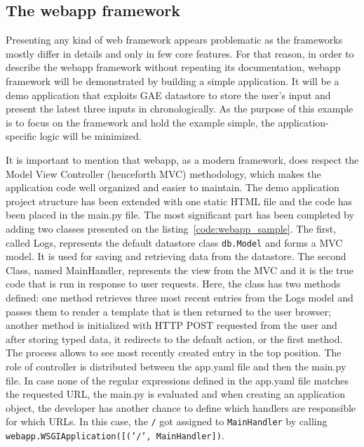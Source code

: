 \subsection{The webapp framework}\label{subsec:webapp}
Presenting any kind of web framework appears problematic as the frameworks mostly differ in details and only in few core features. For that reason, in order to describe the webapp framework without repeating its documentation, webapp framework will be demonstrated by building a simple application. It will be a demo application that exploits GAE datastore to store the user's input and present the latest three inputs in chronologically. As the purpose of this example is to focus on the framework and hold the example simple, the application-specific logic will be minimized.

It is important to mention that webapp, as a modern framework, does respect the Model View Controller (henceforth MVC) methodology, which makes the application code well organized and easier to maintain. The demo application project structure has been extended with one static HTML file and the code has been placed in the main.py file. The most significant part has been completed by adding two classes presented on the listing~\ref{code:webapp_sample}. The first, called Logs, represents the default datastore class \texttt{db.Model} and forms a MVC model. It is used for saving and retrieving data from the datastore. The second Class, named MainHandler, represents the view from the MVC and it is the true code that is run in response to user requests. Here, the class has two methods defined: one method retrieves three most recent entries from the Logs model and passes them to render a template that is then returned to the user browser; another method is initialized with HTTP POST requested from the user and after storing typed data, it redirects to the default action, or the first method. The process allows to see most recently created entry in the top position. The role of controller is distributed between the app.yaml file and then the main.py file. In case none of the regular expressions defined in the app.yaml file matches the requested URL, the main.py is evaluated and when creating an application object, the developer has another chance to define which handlers are responsible for which URLs. In this case, the \texttt{/} got assigned to \texttt{MainHandler} by calling \texttt{webapp.WSGIApplication([('/', MainHandler])}.
\newpage
{}


